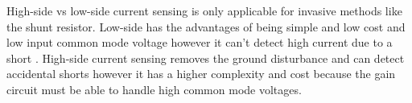 High-side vs low-side current sensing is only applicable for invasive methods like the shunt resistor. Low-side has the advantages of being simple and low cost and low input common mode voltage however it can't detect high current due to a short \cite{EG_CurSens}. High-side current sensing removes the ground disturbance and can detect accidental shorts however it has a higher complexity and cost because the gain circuit must be able to handle high common mode voltages\cite{EG_CurSens}.  